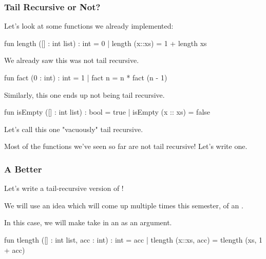 \documentclass[aspectratio=169]{beamer}
\begin{document}
\begin{frame}[fragile]
  \frametitle{Tail Recursive or Not?}

  Let's look at some functions we already implemented:

  \begin{codeblock}
    fun length ([] : int list) : int = 0
      | length (x::xs) = 1 + length xs
  \end{codeblock}

  We already saw this was not tail recursive.

  \begin{codeblock}
    fun fact (0 : int) : int = 1 
      | fact n = n * fact (n - 1)
  \end{codeblock}

  Similarly, this one ends up not being tail recursive.

  \begin{codeblock}
    fun isEmpty ([] : int list) : bool = true
      | isEmpty (x :: xs) = false
  \end{codeblock}

  Let's call this one "vacuously" tail recursive.

  \vspace{\fill}

  Most of the functions we've seen so far are not tail recursive! Let's write one.
\end{frame}

\begin{frame}[fragile]
  \frametitle{A Better }

  Let's write a tail-recursive version of !

  \vspace{\fill}

  We will use an idea which will come up multiple times this semester, of an .

  \vspace{\fill}


  \vspace{\fill}

  In this case, we will make  take in an  as an argument. 

  \vspace{\fill}

  \begin{codeblock}
    fun tlength ([] : int list, acc : int) : int = acc
      | tlength (x::xs, acc) = tlength (xs, 1 + acc) 
  \end{codeblock}
\end{frame}
\end{document}
